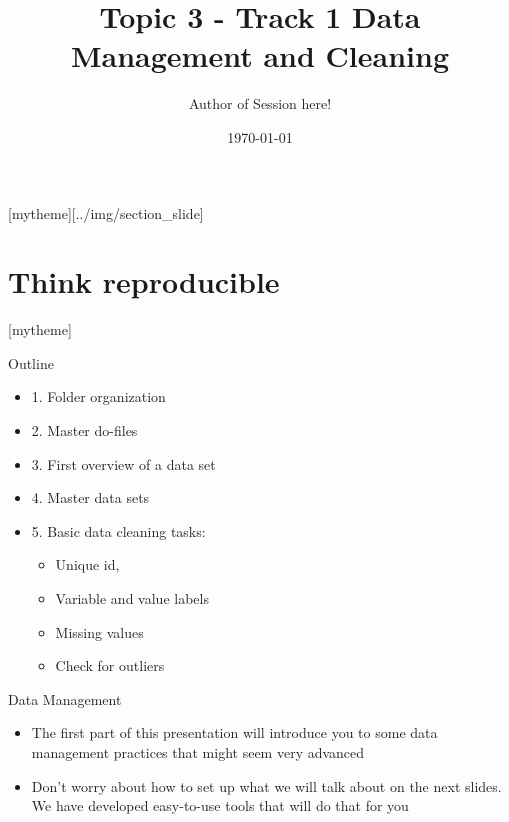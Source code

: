 \documentclass[aspectratio=169]{beamer}
\title{Topic 3 - Track 1 \newline Data Management and Cleaning}
\date{\today}
\author{Author of Session here!} %
\institute{Development Impact Evaluation (DIME) \newline The World Bank }
\newcommand{\sectionpic}[2]{
	\setbeamertemplate{section page}[mytheme][#2]
	\section{#1}
	\setbeamertemplate{section page}[mytheme]
}
\begin{document}
	
{
	\maketitle
}

\sectionpic{Think reproducible}{../img/section_slide}


\begin{frame}{Outline}
	\begin{itemize}
		\item 1. Folder organization
		\item 2. Master do-files
		\item 3. First overview of a data set
		\item 4. Master data sets
		\item 5. Basic data cleaning tasks:
			\begin{itemize}
				\item Unique id, 
				\item Variable and value labels
				\item Missing values
				\item Check for outliers
			\end{itemize}		
	\end{itemize}
\end{frame}


\begin{frame}{Data Management}

\begin{itemize}
	\item The first part of this presentation will introduce you to some data management practices that might seem very advanced
	\item Don’t worry about how to set up what we will talk about on the next slides. We have developed easy-to-use tools that will do that for you
\end{itemize}
\end{frame}
\end{document}
